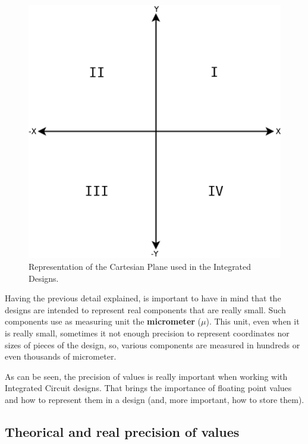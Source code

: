 \documentclass[11pt,twoside,openany,x11names,svgnames]{memoir}
\begin{document}
\begin{figure}
	\centering
	\includegraphics[scale=0.2, clip=true, trim= 0pt 0pt 0pt 0pt]{images/chapter03-image02}
	\caption{Representation of the Cartesian Plane used in the Integrated Designs.}
	\label{fig:iccoordinates}
\end{figure}

Having the previous detail explained, is important to have in mind that the designs are intended to represent real components that are really small. Such components use as measuring unit the \textbf{micrometer} (\textbf{$\mu$}). This unit, even when it is really small, sometimes it not enough precision to represent coordinates nor sizes of pieces of the design, so, various components are measured in hundreds or even thousands of micrometer.

As can be seen, the precision of values is really important when working with Integrated Circuit designs. That brings the importance of floating point values and how to represent them in a design (and, more important, how to store them).

\subsection{Theorical and real precision of values}\label{Theorical-and-real-precision-of-values}
\end{document}
